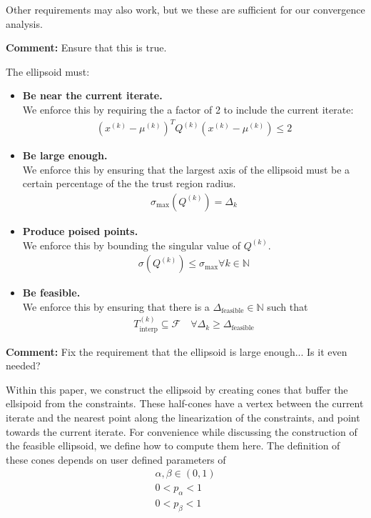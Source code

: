 \documentclass{article}
\newenvironment{comment}
  {\par\medskip
   \color{red}%
   \begin{framed}
   \textbf{Comment: }\ignorespaces}
 {\end{framed}
  \medskip}
\theoremstyle{case}
\newcommand{\xk}{{x^{(k)}}}
\newcommand{\dk}{\Delta_k}
\newcommand{\qk}{{Q^{(k)}}}
\newcommand{\sampletrk}{{T_{\text{interp}}^{(k)}}}
\newcommand{\feasible}{{\mathcal F}}
\newcommand{\ints}{\mathbb N} %
\newcommand{\centerk}{{\mu^{(k)}}}
\newcommand{\sigmamax}{{\sigma_{\text{max}}}}
\newcommand{\deltafeasible}{{\Delta_{\text{feasible}}}}
\begin{document}
Other requirements may also work, but we these are sufficient for our convergence analysis.
\begin{comment}
Ensure that this is true.
\end{comment}
The ellipsoid must:
\begin{itemize}
        \item \textbf{Be near the current iterate.}\\
We enforce this by requiring the a factor of 2 to include the current iterate:
\begin{align}
\label{ellipsoid_close_enough}
(\xk - \centerk)^T \qk(\xk - \centerk) \le 2
\end{align}
        \item \textbf{Be large enough.} \\
        We enforce this by ensuring that the largest axis of the ellipsoid must be a certain percentage of the the trust region radius.
\begin{align}
\label{ellipsoid_large_enough}
\sigma_{\text{max}}(\qk) = \dk
\end{align}
	\item \textbf{Produce poised points.} \\
	We enforce this by bounding the singular value of $\qk$.
\begin{align}
\label{bounded_singular_value}
\sigma(\qk) \le \sigmamax \forall k \in \ints
\end{align}
	\item \textbf{Be feasible.} \\
	We enforce this by ensuring that there is a $\deltafeasible\in\ints$ such that 
\begin{align}
\label{feasible_sample_region}
\sampletrk \subseteq \feasible \quad \forall \dk \ge \deltafeasible
\end{align}
\end{itemize}

\begin{comment}
Fix the requirement that the ellipsoid is large enough...
Is it even needed?
\end{comment}


Within this paper, we construct the ellipsoid by creating cones that buffer the ellsipoid from the constraints.
These half-cones have a vertex between the current iterate and the nearest point along the linearization of the constraints, and point towards the current iterate.
For convenience while discussing the construction of the feasible ellipsoid, we define how to compute them here.
The definition of these cones depends on user defined parameters of 
\begin{align}
\alpha, \beta \in (0, 1) \label{def_alpha_beta} \\
0 < p_{\alpha}  < 1 \label{def_p_alpha} \\
0 < p_{\beta} < 1 \label{def_p_beta}
\end{align}
\end{document}
